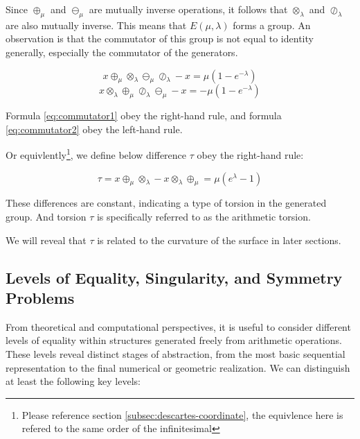 Since $\oplus_\mu$ and $\ominus_\mu$ are mutually inverse operations, it follows that $\otimes_\lambda$ and $\oslash_\lambda$ are also mutually inverse. This means that $E(\mu, \lambda)$ forms a group.
An observation is that the commutator of this group is not equal to identity generally,
especially the commutator of the generators.

\begin{equation}
x \oplus_\mu \otimes_\lambda \ominus_\mu \oslash_\lambda - x = \mu(1 - e^{-\lambda})\label{eq:commutator1}
\end{equation}
\begin{equation}
x \otimes_\lambda \oplus_\mu \oslash_\lambda \ominus_\mu - x = - \mu(1 - e^{-\lambda})\label{eq:commutator2}
\end{equation}

Formula \ref{eq:commutator1} obey the right-hand rule, and formula \ref{eq:commutator2} obey the left-hand rule.

Or equivlently\footnote{Please reference section \ref{subsec:descartes-coordinate}, the equivlence here is refered to the same order of the infinitesimal}, we define below difference $\tau$ obey the right-hand rule:

\begin{equation}
\tau = x \oplus_\mu \otimes_\lambda - x \otimes_\lambda \oplus_\mu = \mu(e^\lambda - 1)\label{eq:torsion}
\end{equation}

These differences are constant, indicating a type of torsion in the generated group.
And torsion $\tau$ is specifically referred to as the arithmetic torsion.

We will reveal that $\tau$ is related to the curvature of the surface in later sections.

\subsection{Levels of Equality, Singularity, and Symmetry Problems}
\label{subsec:problems-on-equality-singularity-symmetries}

From theoretical and computational perspectives, it is useful to consider different levels of equality within structures generated freely from arithmetic operations. These levels reveal distinct stages of abstraction, from the most basic sequential representation to the final numerical or geometric realization. We can distinguish at least the following key levels:

